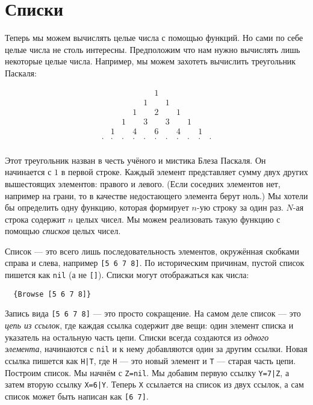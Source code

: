 \section{Списки}

Теперь мы можем вычислять целые числа с помощью функций. Но сами по себе целые числа не столь интересны. Предположим что нам нужно вычислять лишь некоторые целые числа. Например, мы можем захотеть вычислить треугольник Паскаля:

$$
\begin{array}{ccccccccccc}
  & & & & &1& & & & & \\
  & & & &1& &1& & & & \\
  & & &1& &2& &1& & & \\
  & &1& &3& &3& &1& & \\
  &1& &4& &6& &4& &1& \\
 \cdot&\cdot&\cdot&\cdot&\cdot&\cdot&\cdot&\cdot&\cdot&\cdot&\cdot \\
  \end{array}
$$

\newcommand\consgraph[3]{
  \draw (#1, #2) -- (#1, #2 - 0.5);
  \draw [->] (#1, #2 - 0.5) -- (#1 - 0.5, #2 - 1.5) node [below] {#3};
  \draw [->] (#1, #2 - 0.5) -- (#1 + 0.5, #2 - 1.5);
  \node [below left] at (#1, #2 - 0.9) {\tiny{1}};
  \node [below right] at (#1, #2 - 0.9) {\tiny{2}};
}




Этот треугольник назван в честь учёного и мистика Блеза Паскаля. Он начинается с $1$ в первой строке. Каждый элемент представляет сумму двух других вышестоящих элементов: правого и левого. (Если соседних элементов нет, например на грани, то в качестве недостающего элемента берут ноль.) Мы хотели бы определить одну функцию, которая формирует $n$-ую строку за один раз. $N$-ая строка содержит $n$ целых чисел. Мы можем реализовать такую функцию с помощью \emph{списков} целых чисел.



Список --- это всего лишь последовательность элементов, окружённая скобками справа и слева, например \lstinline|[5 6 7 8]|. По историческим причинам, пустой список пишется как \lstinline|nil| (а не \lstinline|[]|). Списки могут отображаться как числа:

\begin{lstlisting}
  {Browse [5 6 7 8]}
\end{lstlisting}

Запись вида \lstinline|[5 6 7 8]| --- это просто сокращение. На самом деле список --- это \emph{цепь из ссылок}, где каждая ссылка содержит две вещи: один элемент списка и указатель на остальную часть цепи. Списки всегда создаются из \emph{одного элемента}, начинаются с \lstinline|nil| и к нему добавляются один за другим ссылки. Новая ссылка пишется как \lstinline!H|T!, где \lstinline|H| --- это новый элемент и \lstinline|T| --- старая часть цепи. Построим список. Мы начнём с \lstinline|Z=nil|. Мы добавим первую ссылку \lstinline!Y=7|Z!, а затем вторую ссылку \lstinline!X=6|Y!. Теперь \lstinline|X| ссылается на список из двух ссылок, а сам список может быть написан как \lstinline|[6 7]|.

